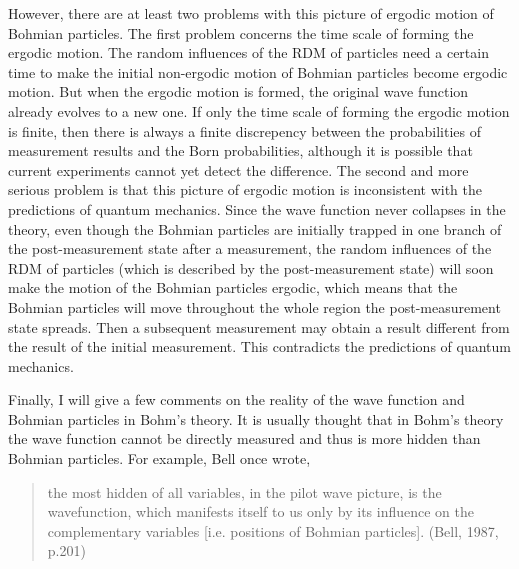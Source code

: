 However, there are at least two problems with this picture of ergodic motion of Bohmian particles.
The first problem concerns the time scale of forming the ergodic motion.
The random influences of  the RDM of particles need a certain time to make the initial non-ergodic motion of Bohmian particles become ergodic motion. But when the ergodic motion is formed, the original wave function already evolves to a new one. If only the time scale of forming the ergodic motion is finite, then there is always a finite discrepency between the probabilities of measurement results and the Born probabilities, although it is possible that current experiments cannot yet detect the difference.
The second and more serious problem is that this picture of ergodic motion is inconsistent with the predictions  of quantum mechanics.
Since the wave function never collapses in the theory, even though the Bohmian particles are initially trapped in one branch of the post-measurement state after a measurement, the random influences of the RDM of particles (which is described by the post-measurement state) will soon make the motion of the Bohmian particles ergodic, which means that the Bohmian particles will move throughout the whole region the post-measurement state spreads. Then a subsequent measurement may obtain a result different from the result of the initial measurement. This contradicts the predictions of quantum mechanics.

Finally, I will give a few comments on the reality of the wave function and Bohmian particles in Bohm's theory.  %
It is usually thought that in Bohm's theory the wave function cannot be directly measured and thus is more hidden than Bohmian particles. For example, Bell once wrote, 

\begin{quote}
the most hidden of all variables, in the pilot wave picture, is the wavefunction, which manifests itself to us only by its influence on the complementary variables [i.e. positions of Bohmian particles]. (Bell, 1987, p.201)
\end{quote}

